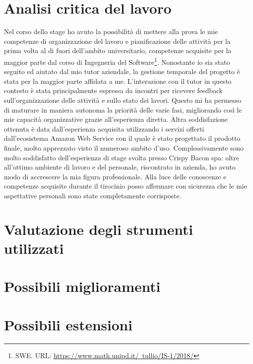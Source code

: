 \section{Analisi critica del lavoro}
Nel corso dello stage ho avuto la possibilità di mettere alla prova le mie competenze di organizzazione del lavoro e pianificazione delle attività per la prima volta al di fuori dell'ambito universitario, competenze acquisite per la maggior parte dal corso di Ingegneria del Software\footnote{SWE. URL: \href{https://www.math.unipd.it/~tullio/IS-1/2018/}{https://www.math.unipd.it/~tullio/IS-1/2018/}}. Nonostante io sia stato seguito ed aiutato dal mio tutor aziendale, la gestione temporale del progetto è stata per la maggior parte affidata a me. L'interazione con il tutor in questo contesto è stata principalmente espressa da incontri per ricevere feedback sull'organizzazione delle attività e sullo stato dei lavori. Questo mi ha permesso di maturare in maniera autonoma la priorità delle varie fasi, migliorando così le mie capacità organizzative grazie all'esperienza diretta. Altra soddisfazione ottenuta è data dall'esperienza acquisita utilizzando i servizi offerti dall'ecosistema Amazon Web Service con il quale è stato progettato il prodotto finale, molto apprezzato visto il numeroso ambito d'uso. Complessivamente sono molto soddisfatto dell'esperienza di stage svolta presso Crispy Bacon spa: oltre all'ottimo ambiente di lavoro e del personale, riscontrato in azienda, ho avuto modo di accrescere la mia figura professionale. Alla luce delle conoscenze e competenze acquisite durante il tirocinio posso affermare con sicurezza che le mie aspettative personali sono state completamente corrisposte.

\section{Valutazione degli strumenti utilizzati}
\section{Possibili miglioramenti}
\section{Possibili estensioni}